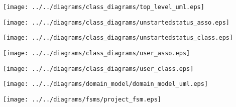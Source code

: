     \begin{frame}
    \begin{center}
    \texttt{[image: ../../diagrams/class\_diagrams/top\_level\_uml.eps]}
    \end{center}
    \end{frame}
    

    \begin{frame}
    \begin{center}
    \texttt{[image: ../../diagrams/class\_diagrams/unstartedstatus\_asso.eps]}
    \end{center}
    \end{frame}
    

    \begin{frame}
    \begin{center}
    \texttt{[image: ../../diagrams/class\_diagrams/unstartedstatus\_class.eps]}
    \end{center}
    \end{frame}
    

    \begin{frame}
    \begin{center}
    \texttt{[image: ../../diagrams/class\_diagrams/user\_asso.eps]}
    \end{center}
    \end{frame}
    

    \begin{frame}
    \begin{center}
    \texttt{[image: ../../diagrams/class\_diagrams/user\_class.eps]}
    \end{center}
    \end{frame}
    

    \begin{frame}
    \begin{center}
    \texttt{[image: ../../diagrams/domain\_model/domain\_model\_uml.eps]}
    \end{center}
    \end{frame}
    

    \begin{frame}
    \begin{center}
    \texttt{[image: ../../diagrams/fsms/project\_fsm.eps]}
    \end{center}
    \end{frame}
    

